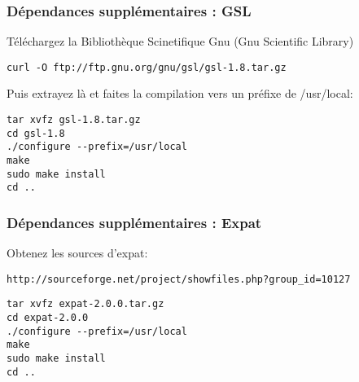 \subsubsection{D\'ependances suppl\'ementaires : GSL}
T\'el\'echargez la Biblioth\`eque Scinetifique Gnu (Gnu Scientific Library)

\begin{verbatim}
curl -O ftp://ftp.gnu.org/gnu/gsl/gsl-1.8.tar.gz 
\end{verbatim}

Puis extrayez l\`a et faites la compilation vers un pr\'efixe de /usr/local:

\begin{verbatim}
tar xvfz gsl-1.8.tar.gz 
cd gsl-1.8 
./configure --prefix=/usr/local 
make
sudo make install
cd ..  
\end{verbatim}

% 
% 

\subsubsection{D\'ependances suppl\'ementaires : Expat}
Obtenez les sources d'expat:

\begin{verbatim}
http://sourceforge.net/project/showfiles.php?group_id=10127 
\end{verbatim}

\begin{verbatim}
tar xvfz expat-2.0.0.tar.gz 
cd expat-2.0.0 
./configure --prefix=/usr/local
make 
sudo make install 
cd ..  
\end{verbatim}

